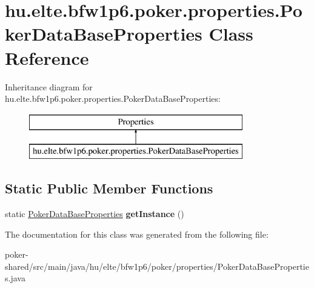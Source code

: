 \hypertarget{classhu_1_1elte_1_1bfw1p6_1_1poker_1_1properties_1_1_poker_data_base_properties}{}\section{hu.\+elte.\+bfw1p6.\+poker.\+properties.\+Poker\+Data\+Base\+Properties Class Reference}
\label{classhu_1_1elte_1_1bfw1p6_1_1poker_1_1properties_1_1_poker_data_base_properties}
Inheritance diagram for hu.\+elte.\+bfw1p6.\+poker.\+properties.\+Poker\+Data\+Base\+Properties\+:\begin{figure}[H]
\begin{center}
\leavevmode
\includegraphics[height=2.000000cm]{classhu_1_1elte_1_1bfw1p6_1_1poker_1_1properties_1_1_poker_data_base_properties}
\end{center}
\end{figure}
\subsection*{Static Public Member Functions}
\begin{DoxyCompactItemize}
\item 
\hypertarget{classhu_1_1elte_1_1bfw1p6_1_1poker_1_1properties_1_1_poker_data_base_properties_a272f2f4108baf541e15ba7db449300ae}{}static \hyperlink{classhu_1_1elte_1_1bfw1p6_1_1poker_1_1properties_1_1_poker_data_base_properties}{Poker\+Data\+Base\+Properties} {\bfseries get\+Instance} ()\label{classhu_1_1elte_1_1bfw1p6_1_1poker_1_1properties_1_1_poker_data_base_properties_a272f2f4108baf541e15ba7db449300ae}

\end{DoxyCompactItemize}


The documentation for this class was generated from the following file\+:\begin{DoxyCompactItemize}
\item 
poker-\/shared/src/main/java/hu/elte/bfw1p6/poker/properties/Poker\+Data\+Base\+Properties.\+java\end{DoxyCompactItemize}
